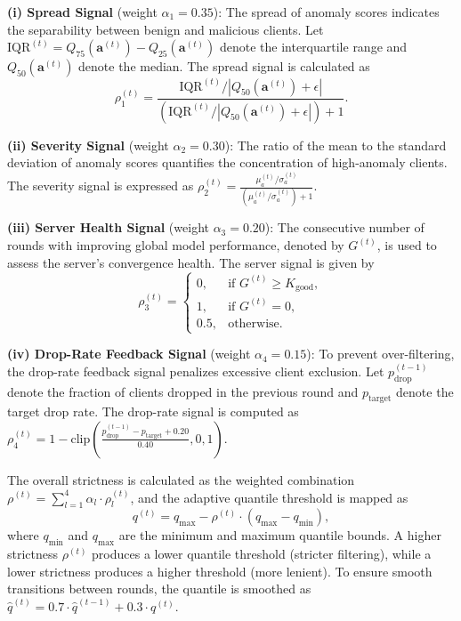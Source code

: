 \textbf{(i) Spread Signal} (weight $\alpha_1 = 0.35$): The spread of anomaly scores indicates the separability between benign and malicious clients. Let $\text{IQR}^{(t)} = Q_{75}(\mathbf{a}^{(t)}) - Q_{25}(\mathbf{a}^{(t)})$ denote the interquartile range and $Q_{50}(\mathbf{a}^{(t)})$ denote the median. The spread signal is calculated as
\begin{equation}\label{eq:spread}
    \rho_1^{(t)} = \frac{\text{IQR}^{(t)} / |Q_{50}(\mathbf{a}^{(t)}) + \epsilon|}{(\text{IQR}^{(t)} / |Q_{50}(\mathbf{a}^{(t)}) + \epsilon|) + 1}.
\end{equation}

\textbf{(ii) Severity Signal} (weight $\alpha_2 = 0.30$): The ratio of the mean to the standard deviation of anomaly scores quantifies the concentration of high-anomaly clients. The severity signal is expressed as $\rho_2^{(t)} = \frac{\mu_a^{(t)} / \sigma_a^{(t)}}{(\mu_a^{(t)} / \sigma_a^{(t)}) + 1}$.

\textbf{(iii) Server Health Signal} (weight $\alpha_3 = 0.20$): The consecutive number of rounds with improving global model performance, denoted by $G^{(t)}$, is used to assess the server's convergence health. The server signal is given by
\begin{equation}\label{eq:server}
    \rho_3^{(t)} =
    \begin{cases}
        0, & \text{if } G^{(t)} \geq K_{\text{good}}, \\
        1, & \text{if } G^{(t)} = 0, \\
        0.5, & \text{otherwise}.
    \end{cases}
\end{equation}

\textbf{(iv) Drop-Rate Feedback Signal} (weight $\alpha_4 = 0.15$): To prevent over-filtering, the drop-rate feedback signal penalizes excessive client exclusion. Let $p_{\text{drop}}^{(t-1)}$ denote the fraction of clients dropped in the previous round and $p_{\text{target}}$ denote the target drop rate. The drop-rate signal is computed as $\rho_4^{(t)} = 1 - \text{clip}\left(\frac{p_{\text{drop}}^{(t-1)} - p_{\text{target}} + 0.20}{0.40}, 0, 1\right)$.

The overall strictness is calculated as the weighted combination $\rho^{(t)} = \sum_{l=1}^{4} \alpha_l \cdot \rho_l^{(t)}$, and the adaptive quantile threshold is mapped as
\begin{equation}\label{eq:quantile_map}
    q^{(t)} = q_{\max} - \rho^{(t)} \cdot (q_{\max} - q_{\min}),
\end{equation}
where $q_{\min}$ and $q_{\max}$ are the minimum and maximum quantile bounds. A higher strictness $\rho^{(t)}$ produces a lower quantile threshold (stricter filtering), while a lower strictness produces a higher threshold (more lenient). To ensure smooth transitions between rounds, the quantile is smoothed as $\hat{q}^{(t)} = 0.7 \cdot \hat{q}^{(t-1)} + 0.3 \cdot q^{(t)}$.

